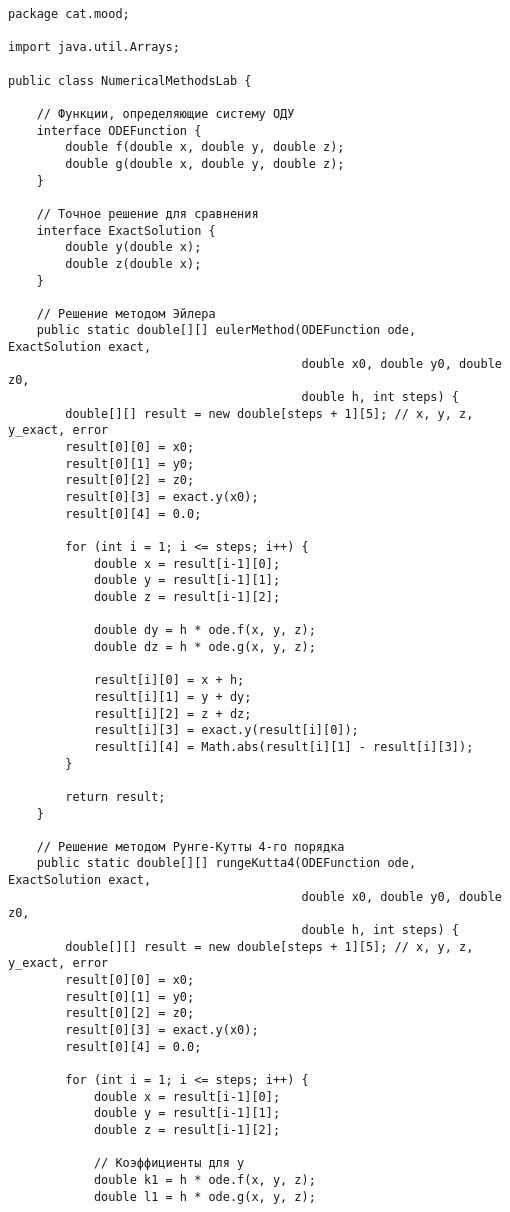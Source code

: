 \begin{verbatim}
package cat.mood;

import java.util.Arrays;

public class NumericalMethodsLab {

    // Функции, определяющие систему ОДУ
    interface ODEFunction {
        double f(double x, double y, double z);
        double g(double x, double y, double z);
    }

    // Точное решение для сравнения
    interface ExactSolution {
        double y(double x);
        double z(double x);
    }

    // Решение методом Эйлера
    public static double[][] eulerMethod(ODEFunction ode, ExactSolution exact,
                                         double x0, double y0, double z0,
                                         double h, int steps) {
        double[][] result = new double[steps + 1][5]; // x, y, z, y_exact, error
        result[0][0] = x0;
        result[0][1] = y0;
        result[0][2] = z0;
        result[0][3] = exact.y(x0);
        result[0][4] = 0.0;

        for (int i = 1; i <= steps; i++) {
            double x = result[i-1][0];
            double y = result[i-1][1];
            double z = result[i-1][2];

            double dy = h * ode.f(x, y, z);
            double dz = h * ode.g(x, y, z);

            result[i][0] = x + h;
            result[i][1] = y + dy;
            result[i][2] = z + dz;
            result[i][3] = exact.y(result[i][0]);
            result[i][4] = Math.abs(result[i][1] - result[i][3]);
        }

        return result;
    }

    // Решение методом Рунге-Кутты 4-го порядка
    public static double[][] rungeKutta4(ODEFunction ode, ExactSolution exact,
                                         double x0, double y0, double z0,
                                         double h, int steps) {
        double[][] result = new double[steps + 1][5]; // x, y, z, y_exact, error
        result[0][0] = x0;
        result[0][1] = y0;
        result[0][2] = z0;
        result[0][3] = exact.y(x0);
        result[0][4] = 0.0;

        for (int i = 1; i <= steps; i++) {
            double x = result[i-1][0];
            double y = result[i-1][1];
            double z = result[i-1][2];

            // Коэффициенты для y
            double k1 = h * ode.f(x, y, z);
            double l1 = h * ode.g(x, y, z);


\end{verbatim}
